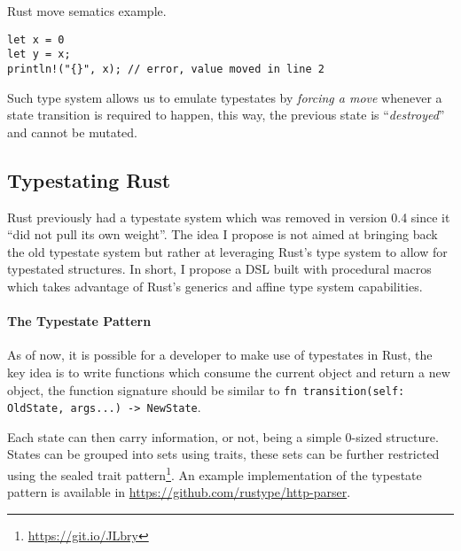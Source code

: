 \documentclass[a4paper, 10pt]{article}
\newenvironment{code}{\captionsetup{type=listing}}{}
\begin{document}

\begin{code}
    \caption{Rust move sematics example.}
    \label{lst:rust-move-semantics}
    \begin{verbatim}
let x = 0
let y = x;
println!("{}", x); // error, value moved in line 2
    \end{verbatim}
\end{code}

Such type system allows us to emulate typestates by \emph{forcing a move} whenever a state transition is required to happen,
this way, the previous state is “\emph{destroyed}” and cannot be mutated.

\subsection*{Typestating Rust}

Rust previously had a typestate system which was removed in version 0.4 since it “did not pull its own weight”.
The idea I propose is not aimed at bringing back the old typestate system but rather at leveraging Rust's type system to allow for typestated structures.
In short, I propose a DSL built with procedural macros which takes advantage of Rust's generics and affine type system capabilities.

\paragraph{The Typestate Pattern}

As of now, it is possible for a developer to make use of typestates in Rust,
the key idea is to write functions which consume the current object and return a new object,
the function signature should be similar to \texttt{fn transition(self: OldState, args...) -> NewState}.

Each state can then carry information, or not, being a simple 0-sized structure.
States can be grouped into sets using traits,
these sets can be further restricted using the sealed trait pattern\footnote{\url{https://git.io/JLbry}}.
An example implementation of the typestate pattern is available in \url{https://github.com/rustype/http-parser}.

\end{document}
